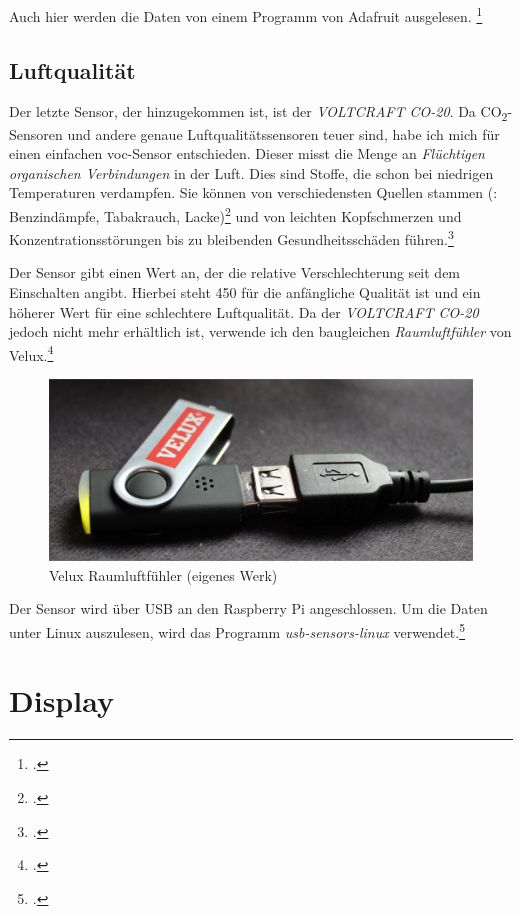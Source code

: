 Auch hier werden die Daten von einem Programm von Adafruit ausgelesen. \footcite[Using the Adafruit BMP Python Library (Updated)]{bmp058_adafruit}

\subsection{Luftqualität}
\label{subsec:Luftqualitat}
Der letzte Sensor, der hinzugekommen ist, ist der \emph{VOLTCRAFT CO-20}. Da CO\textsubscript{2}-Sensoren und andere genaue Luftqualitätssensoren teuer sind, habe ich mich für einen einfachen \acrshort{voc}-Sensor entschieden. Dieser misst die Menge an \emph{Flüchtigen organischen Verbindungen} in der Luft. Dies sind Stoffe, die schon bei niedrigen Temperaturen verdampfen. Sie können von verschiedensten Quellen stammen (\zB: Benzindämpfe, Tabakrauch, Lacke)\footcite[41\psqq]{innenraum} und von leichten Kopfschmerzen und Konzentrationsstörungen bis zu bleibenden Gesundheitsschäden führen.\footcite[Gesundheitliche Wirkung]{VOC}

Der Sensor gibt einen Wert an, der die relative Verschlechterung seit dem Einschalten angibt. Hierbei steht 450 für die anfängliche Qualität ist und ein höherer Wert für eine schlechtere Luftqualität.
Da der \emph{VOLTCRAFT CO-20} jedoch nicht mehr erhältlich ist, verwende ich den baugleichen \emph{Raumluftfühler} von Velux.\footcite{Velux}

\begin{figure}[h]
  \centering
     \includegraphics[width=\textwidth]{figures/velux.jpg}
  \caption{Velux Raumluftfühler (eigenes Werk)}
  \label{fig:velux}
\end{figure}

Der Sensor wird über USB an den Raspberry Pi angeschlossen. Um die Daten unter Linux auszulesen, wird das Programm \emph{usb-sensors-linux} verwendet.\footcite{usb-sensors-linux}

\section{Display}
\label{sec:Display}

